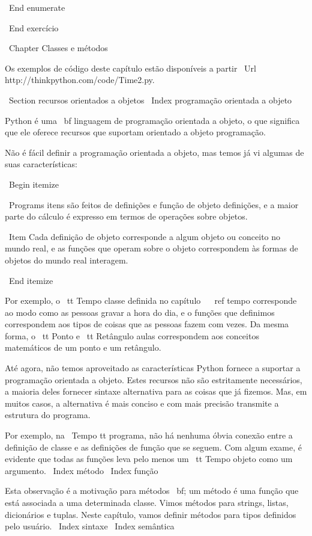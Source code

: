 \documentclass[10pt]{book}
\begin{document}
\begin {itemize}
{{{{{{{{{{{{{{\ End {enumerate}

\ End {} exercício


\ Chapter {Classes e métodos}

Os exemplos de código deste capítulo estão disponíveis a partir
\ Url {http://thinkpython.com/code/Time2.py}.

\ Section {recursos orientados a objetos}
\ Index {programação orientada a objeto}

Python é uma {\ bf linguagem de programação orientada a objeto}, o que significa
que ele oferece recursos que suportam orientado a objeto
programação.

Não é fácil definir a programação orientada a objeto, mas temos
já vi algumas de suas características:

\ Begin {itemize}

\ Programs itens são feitos de definições e função de objeto
definições, e a maior parte do cálculo é expresso em termos
de operações sobre objetos.

\ Item Cada definição de objeto corresponde a algum objeto ou conceito
no mundo real, e as funções que operam sobre o objeto
correspondem às formas de objetos do mundo real interagem.

\ End {itemize}

Por exemplo, o {\ tt Tempo} classe definida no capítulo ~ \ ref {tempo}
corresponde ao modo como as pessoas gravar a hora do dia, e o
funções que definimos correspondem aos tipos de coisas que as pessoas fazem com
vezes. Da mesma forma, o {\ tt Ponto} e {\ tt Retângulo} aulas
correspondem aos conceitos matemáticos de um ponto e um retângulo.

Até agora, não temos aproveitado as características Python fornece a
suportar a programação orientada a objeto. Estes
recursos não são estritamente necessários, a maioria deles fornecer
sintaxe alternativa para as coisas que já fizemos. Mas, em muitos casos,
a alternativa é mais conciso e com mais precisão transmite a
estrutura do programa.

Por exemplo, na {\ Tempo tt} programa, não há nenhuma óbvia
conexão entre a definição de classe e as definições de função
que se seguem. Com algum exame, é evidente que todas as funções
leva pelo menos um {\ tt Tempo} objeto como um argumento.
\ Index {método}
\ Index {função}

Esta observação é a motivação para {métodos \ bf}; um método é
uma função que está associada a uma determinada classe.
Vimos métodos para strings, listas, dicionários e tuplas.
Neste capítulo, vamos definir métodos para tipos definidos pelo usuário.
\ Index {} sintaxe
\ Index {} semântica

}}}}}}}}}}}}}}
\end{itemize}
\end{document}
